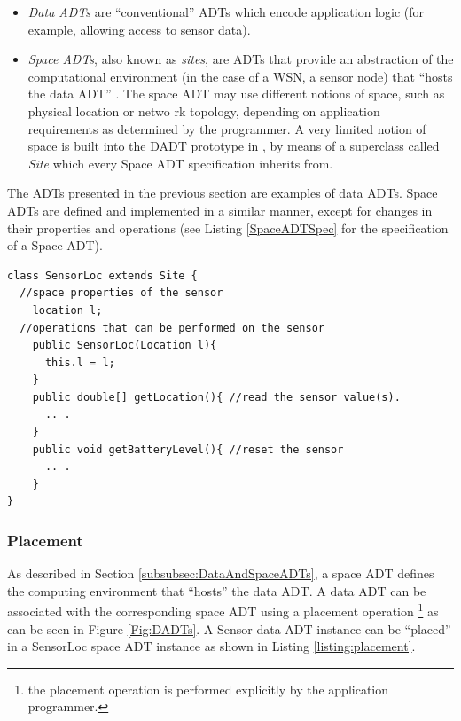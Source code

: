 \begin{itemize}
  \item \emph{Data ADTs} are ``conventional'' ADTs which encode
  application logic (for example, allowing access to sensor data).
  \item \emph{Space ADTs}, also known as \emph{sites}, are ADTs that provide an
  abstraction of the computational environment (in the case of a WSN, a sensor
  node) that ``hosts the data ADT'' \cite{migliavacca_DADT:2006}. The space ADT
  may use different notions of space, such as physical location or netwo
 rk topology, depending on application requirements as determined by the
 programmer. A very limited notion of space is built into the DADT prototype in
 \cite{migliavacca_DADT:2006}, by means of a superclass called \emph{Site} which
 every Space ADT specification inherits from.
\end{itemize}

The ADTs presented in the previous section are examples of data ADTs. Space
ADTs are defined and implemented in a similar manner, except for changes in
their properties and operations (see Listing \ref{SpaceADTSpec} for the
specification of a Space ADT).  
 
 \begin{lstlisting}[frame=trbl, basewidth={0.55em, 0.6em}, captionpos=b, basicstyle=\ttfamily\footnotesize, breaklines, caption = Sensor Space ADT specification (reproduced from \cite{migliavacca_DADT:2006}), label = listing:SpaceADTSpec ]
class SensorLoc extends Site {
  //space properties of the sensor 
	location l;
  //operations that can be performed on the sensor
	public SensorLoc(Location l){
	  this.l = l;
	}
	public double[] getLocation(){ //read the sensor value(s).
	  .. .
	}
	public void getBatteryLevel(){ //reset the sensor
	  .. .
	}
}
\end{lstlisting}
 
\subsubsection{Placement}
 
As described in Section \ref{subsubsec:DataAndSpaceADTs}, a space ADT defines
the computing environment that ``hosts'' the data ADT. A data ADT can be
associated with the corresponding space ADT using a placement operation
\footnote{the placement operation is
performed explicitly by the application programmer.} as can be seen in Figure \ref{Fig:DADTs}.
A Sensor data ADT
instance can be ``placed'' in a SensorLoc space ADT instance as shown in Listing
\ref{listing:placement}. 

